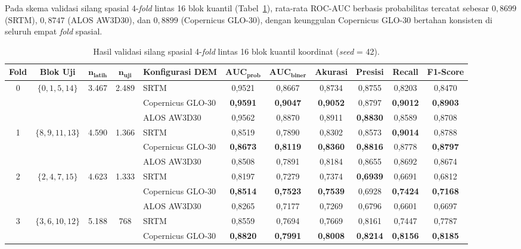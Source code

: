 \documentclass[11pt,twoside]{article}
\begin{document}
Pada skema validasi silang spasial 4-\textit{fold} lintas 16 blok kuantil (Tabel~\ref{tab:spatial-cv-id}), rata-rata ROC-AUC berbasis probabilitas tercatat sebesar $0{,}8699$ (SRTM), $0{,}8747$ (ALOS AW3D30), dan $0{,}8899$ (Copernicus GLO-30), dengan keunggulan Copernicus GLO-30 bertahan konsisten di seluruh empat \textit{fold} spasial.

\begin{table}[!htbp]
\small
\centering
\caption{Hasil validasi silang spasial 4-\textit{fold} lintas 16 blok kuantil koordinat (\textit{seed} = 42).}
\label{tab:spatial-cv-id}
\begin{adjustbox}{max width=\textwidth}
\begin{tabular}{c c c c l cccccc}
\toprule
\textbf{Fold} & \textbf{Blok Uji} & $\boldsymbol{n_{\text{latih}}}$ & $\boldsymbol{n_{\text{uji}}}$ & \textbf{Konfigurasi DEM} & $\textbf{AUC}_{\textbf{prob}}$ & $\textbf{AUC}_{\textbf{biner}}$ & \textbf{Akurasi} & \textbf{Presisi} & \textbf{Recall} & \textbf{F1-Score} \\
\midrule
0 & $\{0, 1, 5, 14\}$ & 3.467 & 2.489 & SRTM & 0,9521 & 0,8667 & 0,8734 & 0,8755 & 0,8203 & 0,8470 \\
  & & & & Copernicus GLO-30 & \textbf{0,9591} & \textbf{0,9047} & \textbf{0,9052} & 0,8797 & \textbf{0,9012} & \textbf{0,8903} \\
  & & & & ALOS AW3D30 & 0,9562 & 0,8870 & 0,8911 & \textbf{0,8830} & 0,8589 & 0,8708 \\
\midrule
1 & $\{8, 9, 11, 13\}$ & 4.590 & 1.366 & SRTM & 0,8519 & 0,7890 & 0,8302 & 0,8573 & \textbf{0,9014} & 0,8788 \\
  & & & & Copernicus GLO-30 & \textbf{0,8673} & \textbf{0,8119} & \textbf{0,8360} & \textbf{0,8816} & 0,8778 & \textbf{0,8797} \\
  & & & & ALOS AW3D30 & 0,8508 & 0,7891 & 0,8184 & 0,8655 & 0,8692 & 0,8674 \\
\midrule
2 & $\{2, 4, 7, 15\}$ & 4.623 & 1.333 & SRTM & 0,8197 & 0,7279 & 0,7374 & \textbf{0,6939} & 0,6691 & 0,6812 \\
  & & & & Copernicus GLO-30 & \textbf{0,8514} & \textbf{0,7523} & \textbf{0,7539} & 0,6928 & \textbf{0,7424} & \textbf{0,7168} \\
  & & & & ALOS AW3D30 & 0,8265 & 0,7177 & 0,7269 & 0,6796 & 0,6601 & 0,6697 \\
\midrule
3 & $\{3, 6, 10, 12\}$ & 5.188 & 768 & SRTM & 0,8559 & 0,7694 & 0,7669 & 0,8161 & 0,7447 & 0,7787 \\
  & & & & Copernicus GLO-30 & \textbf{0,8820} & \textbf{0,7991} & \textbf{0,8008} & \textbf{0,8214} & \textbf{0,8156} & \textbf{0,8185} \\

\end{tabular}
\end{adjustbox}
\end{table}
\end{document}
